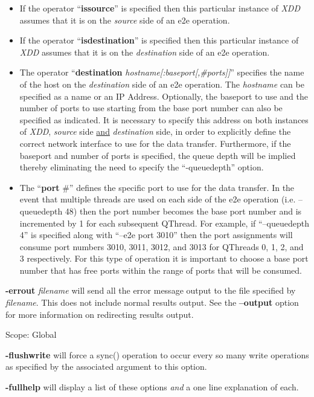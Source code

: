\begin{itemize}
\item
  If the operator ``\textbf{issource}'' is specified then this particular instance of \emph{XDD} assumes that it is on the \emph{source} side of an e2e operation.
\item
  If the operator ``\textbf{isdestination}'' is specified then this particular instance of \emph{XDD} assumes that it is on the \emph{destination} side of an e2e operation.
\item
  The operator ``\textbf{destination} \emph{hostname{[}:baseport{[},\#ports{]}{]}}'' specifies the name of the host on the \emph{destination} side of an e2e operation. The \emph{hostname} can be specified as a name or an IP Address. Optionally, the baseport to use and the number of ports to use starting from the base port number can also be specified as indicated. It is necessary to specify this address on both instances of \emph{XDD}, \emph{source} side \ul{and} \emph{destination} side, in order to explicitly define the correct network interface to use for the data transfer. Furthermore, if the baseport and number of ports is specified, the queue depth will be implied thereby eliminating the need to specify the ``-queuedepth'' option.
\item
  The ``\textbf{port} \#'' defines the specific port to use for the data transfer. In the event that multiple threads are used on each side of the e2e operation (i.e. --queuedepth 48) then the port number becomes the base port number and is incremented by 1 for each subsequent QThread. For example, if ``--queuedepth 4'' is specified along with ``--e2e port 3010'' then the port assignments will consume port numbers 3010, 3011, 3012, and 3013 for QThreads 0, 1, 2, and 3 respectively. For this type of operation it is important to choose a base port number that has free ports within the range of ports that will be consumed.
\end{itemize}

\textbf{-errout} \emph{filename} will send all the error message output to the file specified by \emph{filename}. This does not include normal results output. See the \textbf{--output} option for more information on redirecting results output.

Scope: Global

\textbf{-flushwrite} will force a sync() operation to occur every so many write operations as specified by the associated argument to this option.

\textbf{-fullhelp} will display a list of these options \emph{and} a one line explanation of each.


